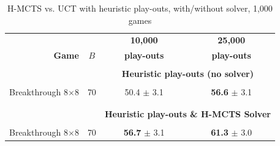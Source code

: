 \documentclass{kecsmstr}
\begin{document}
\begin{table}[ht]
\centering
\tabcolsep=0.3cm
\vspace{3mm}
{\caption{H-MCTS Solver vs. MCTS-Solver with random play-outs, 1,000 games.} \label{tab:uct-s_hmcts-s}}
\end{table}


\begin{table}[ht]
\centering
\tabcolsep=0.3cm
\begin{tabular}{rlcc}
\hline
\multicolumn{2}{c|}{} & \multicolumn{1}{c}{\textbf{10,000}} & \multicolumn{1}{c}{\textbf{25,000}} \\ 
\textbf{Game} & \multicolumn{1}{c|}{\textbf{$B$}} & \multicolumn{1}{c}{\textbf{play-outs}} & \multicolumn{1}{c}{\textbf{play-outs}} \\ [1mm] 
\cline{1-4}
\multicolumn{2}{c|}{} \\ [-3mm]
\multicolumn{2}{c|}{} & \multicolumn{2}{c}{\textbf{Heuristic play-outs (no solver)}} \\ [1mm]
\multicolumn{2}{c|}{} \\ [-4mm]
Breakthrough 8$\times$8 &\multicolumn{1}{l|}{70}	& 50.4 $\pm$ 3.1				& {\bf{56.6}} $\pm$ 3.1 	\\ [.5mm]
\multicolumn{2}{c|}{} \\ [-4mm]
\cline{1-4}
\multicolumn{2}{c|}{} \\ [-3mm]
\multicolumn{2}{c|}{} & \multicolumn{2}{c}{\textbf{Heuristic play-outs \& H-MCTS Solver}} 					\\ [1mm]
\multicolumn{2}{c|}{} \\ [-4mm]
Breakthrough 8$\times$8 &\multicolumn{1}{l|}{70}	& {\bf{56.7}} $\pm$ 3.1		& {\bf{61.3}} $\pm$ 3.0 	\\ [.5mm]
\hline
\end{tabular}
\vspace{3mm}
{\caption{H-MCTS vs. UCT with heuristic play-outs, with/without solver, 1,000 games} \label{tab:uct_hmcts-s-h}}
\end{table}
\end{document}
